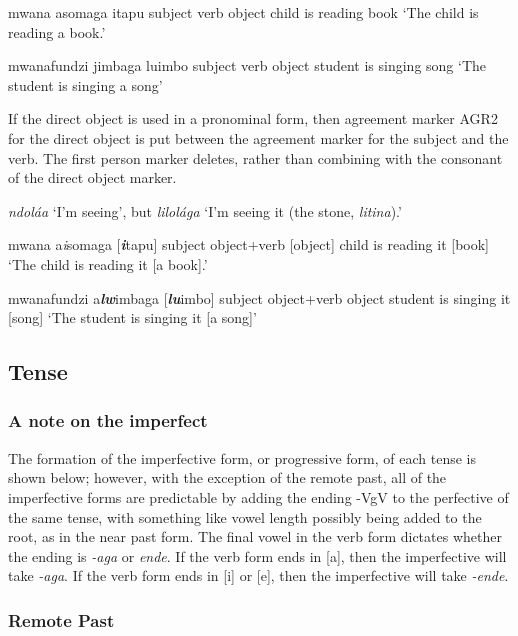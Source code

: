 \glll mwana asoma\engma{}ga \esh{}itapu 
subject verb object
child {is reading} book
\glt`The child is reading a book.'
\glend

\glll mwanafundzi jimba\engma{}ga luimbo
subject verb object
student {is singing} song
\glt `The student is singing a song'
\glend

If the direct object is used in a pronominal form, then agreement marker AGR2 for the direct object is put between the agreement marker for the subject and the verb.  The first person marker deletes, rather than combining with the consonant of the direct object marker.\\

\emph{ndol\'a\engma{}a} `I'm seeing', but \emph{lilol\'a\engma{}ga} `I'm seeing it (the stone, \emph{lit\esh{}ina}).'

\glll mwana a\emph{\textbf{\esh{}}i}soma\engma{}ga [\emph{\textbf{\esh{}i}}tapu]
subject {object+verb} [object]
child {is reading it} {[book]}
\glt`The child is reading it [a book].'
\glend

\glll mwanafundzi  a\emph{\textbf{lw}}imba\engma{}ga [\emph{\textbf{lu}}imbo]
subject {object+verb} object
student {is singing it} {[song]}
\glt `The student is singing it [a song]'
\glend

\subsection{Tense}

\subsubsection{A note on the imperfect}
The formation of the imperfective form, or progressive form, of each tense is shown below; however, with the exception of the remote past, all of the imperfective forms are predictable by adding the ending -V\engma{}gV to the perfective of the same tense, with something like vowel length possibly being added to the root, as in the near past form.  The final vowel in the verb form dictates whether the ending is \emph{-a\engma{}ga} or \emph{end\ezh{}e}.  If the verb form ends in [a], then the imperfective will take \emph{-a\engma{}ga}.  If the verb form ends in [i] or [e], then the imperfective will take \emph{-end\ezh{}e}.

\subsubsection{Remote Past}

